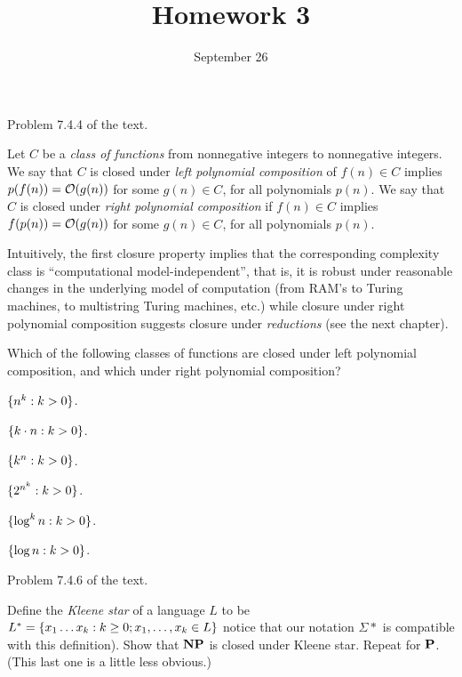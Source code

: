 \documentclass{../math167}
\title{Homework 3}
\author{}
\date{September 26}
\begin{document}
\begin{problems}
\item Problem 7.4.4 of the text.
  \begin{book}
    Let \(C\) be a \emph{class of functions} from nonnegative integers
    to nonnegative integers.  We say that \(C\) is closed under
    \emph{left polynomial composition} of \(f(n) \in C\) implies
    \(p(f(n)) = \O(g(n))\) for some \(g(n) \in C\), for all
    polynomials \(p(n)\).  We say that \(C\) is closed under
    \emph{right polynomial composition} if \(f(n) \in C\) implies
    \(f(p(n)) = \O(g(n))\) for some \(g(n) \in C\), for all
    polynomials \(p(n)\).

    Intuitively, the first closure property implies that the
    corresponding complexity class is ``computational
    model-independent'', that is, it is robust under reasonable
    changes in the underlying model of computation (from RAM's to
    Turing machines, to multistring Turing machines, etc.) while
    closure under right polynomial composition suggests closure under
    \emph{reductions} (see the next chapter).

    Which of the following classes of functions are closed under left
    polynomial composition, and which under right polynomial
    composition?
    \begin{problems}
    \item \(\set{n^k : k > 0}\).
    \item \(\set{k \cdot n : k > 0}\).
    \item \(\set{k^n : k > 0}\).
    \item \(\set{2^{n^k} : k > 0}\).
    \item \(\set{\log^k n : k > 0}\).
    \item \(\set{\log n : k > 0}\).
    \end{problems}
  \end{book}

  \begin{solution}
    \begin{problems}
    \item
    \item
    \item
    \item
    \item
    \item
    \end{problems}
  \end{solution}

\item Problem 7.4.6 of the text.
  \begin{book}
    Define the \emph{Kleene star} of a language \(L\) to be
    \(L^* = \set{x_1 \dots x_k : k \ge 0; x_1, \dots, x_k \in L}\)
    notice that our notation \(\Sigma*\) is compatible with this
    definition).  Show that \(\NP\) is closed under Kleene star.
    Repeat for \(\P\).  (This last one is a little less obvious.)
  \end{book}


\end{problems}
\end{document}
